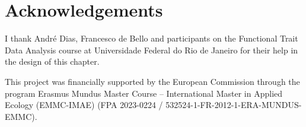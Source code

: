 \documentclass[12pt,a4paper]{book}
\begin{document}
\section{Acknowledgements}

I thank Andr\'{e} Dias, Francesco de Bello and participants on the Functional Trait Data Analysis course at Universidade Federal do Rio de Janeiro for their help in the design of this chapter.

This project was financially supported by the European Commission through the program Erasmus Mundus Master Course -- International Master in Applied Ecology (EMMC-IMAE) (FPA 2023-0224 / 532524-1-FR-2012-1-ERA-MUNDUS-EMMC).



\end{document}
